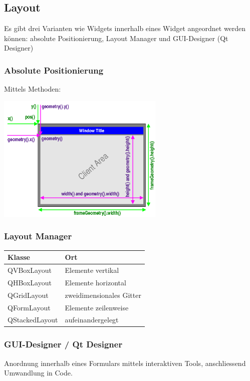 \subsection{Layout}
Es gibt drei Varianten wie Widgets innerhalb eines Widget angeordnet werden können: \newline
absolute Positionierung, Layout Manager und GUI-Designer (Qt Designer)

\subsubsection{Absolute Positionierung}
Mittels Methoden:
\begin{multicols}{2}	
	
	
	\includegraphics[width=8cm]{images/geometry.png}
\end{multicols}

\subsubsection{Layout Manager} %
	\begin{tabular}{|l|l|}
		\hline \textbf{Klasse} & \textbf{Ort}\\
		\hline QVBoxLayout & Elemente vertikal\\
		\hline QHBoxLayout & Elemente horizontal\\
		\hline QGridLayout & zweidimensionales Gitter\\
		\hline QFormLayout & Elemente zeilenweise\\
		\hline QStackedLayout & aufeinandergelegt\\
		\hline
	\end{tabular}
	
\subsubsection{GUI-Designer / Qt Designer}	
	Anordnung innerhalb eines Formulars mittels interaktiven Tools, anschliessend Umwandlung in Code. 	


